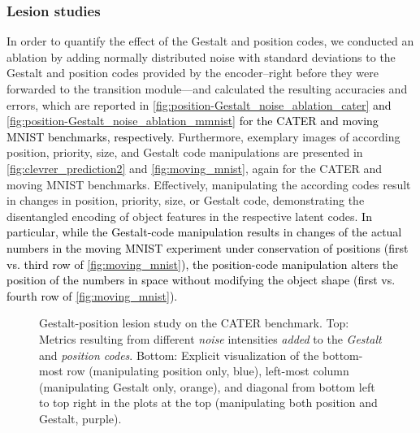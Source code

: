 \documentclass{article} \usepackage{iclr2023_conference_arxiv,times}
\def\imagepaddingtiny{0.1cm}
\newcommand{\changed}{\textcolor{black}}
\begin{document}
\subsubsection{Lesion studies}\label{sec:lesion_studies}
In order to quantify the effect of the Gestalt and position codes, we conducted an ablation by adding normally distributed noise with standard deviations  to the Gestalt and position codes provided by the encoder--right before they were forwarded to the transition module---and calculated the resulting accuracies and errors, which are reported in \autoref{fig:position-Gestalt_noise_ablation_cater} \changed{and \autoref{fig:position-Gestalt_noise_ablation_mmnist} for the CATER and moving MNIST benchmarks, respectively}. Furthermore, exemplary images of according position, priority, size, and Gestalt code manipulations are presented in \autoref{fig:clevrer_prediction2} and \autoref{fig:moving_mnist}, again for the CATER and moving MNIST benchmarks. Effectively, manipulating the according codes result in changes in position, priority, size, or Gestalt code, demonstrating the disentangled encoding of object features in the respective latent codes. \changed{In particular, while the Gestalt-code manipulation results in changes of the actual numbers in the moving MNIST experiment under conservation of positions (first vs. third row of \autoref{fig:moving_mnist}), the position-code manipulation alters the position of the numbers in space without modifying the object shape (first vs. fourth row of \autoref{fig:moving_mnist}).}

\begin{figure}[htb!]
    \centering
    \begin{elasticrow}[\imagepaddingtiny]
    \end{elasticrow}
    
    \vspace{0.2cm}
    
    \begin{elasticrow}[\imagepaddingtiny]
    \end{elasticrow}
    \caption{Gestalt-position lesion study on the CATER benchmark. Top: Metrics resulting from different \textit{noise} intensities \textit{added} to the \textit{Gestalt} and \textit{position codes}. Bottom: Explicit visualization of the bottom-most row (manipulating position only, blue), left-most column (manipulating Gestalt only, orange), and diagonal from bottom left to top right in the plots at the top (manipulating both position and Gestalt, purple).}
    \label{fig:position-Gestalt_noise_ablation_cater}
\end{figure}
\end{document}
